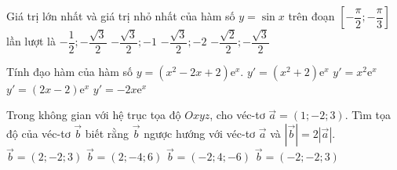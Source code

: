 \begin{ex}%
	Giá trị lớn nhất và giá trị nhỏ nhất của hàm số  $y=\sin x$ trên đoạn $\left[-\dfrac{\pi}{2};-\dfrac{\pi}{3}\right]$ lần lượt là
	\choice
	{$-\dfrac{1}{2}; -\dfrac{\sqrt{3}}{2}$}
	{\True $-\dfrac{\sqrt{3}}{2}; -1$}
	{$-\dfrac{\sqrt{3}}{2}; -2$}
	{$-\dfrac{\sqrt{2}}{2}; -\dfrac{\sqrt{3}}{2}$}
\end{ex}

\begin{ex}%
	Tính đạo hàm của hàm số $y=\left(x^2-2x+2\right)\mathrm{e}^x$.
	\choice
	{$y'=\left(x^2+2\right)\mathrm{e}^x$}
	{\True $y'=x^2\mathrm{e}^x$}
	{$y'=\left(2x-2\right)\mathrm{e}^x$}
	{$y'=-2x\mathrm{e}^x$}
\end{ex}

\begin{ex}%
	Trong không gian với hệ trục tọa độ $Oxyz$, cho véc-tơ $\overrightarrow{a}=(1;-2;3)$. Tìm tọa độ của véc-tơ $\overrightarrow{b}$ biết rằng $\overrightarrow{b}$ ngược hướng với véc-tơ $\overrightarrow{a}$ và $\left|\overrightarrow{b}\right|=2\left|\overrightarrow{a}\right|$.
	\choice
	{$\overrightarrow{b}=(2;-2;3)$}
	{$\overrightarrow{b}=(2;-4;6)$}
	{\True $\overrightarrow{b}=(-2;4;-6)$}
	{$\overrightarrow{b}=(-2;-2;3)$}
\end{ex}

